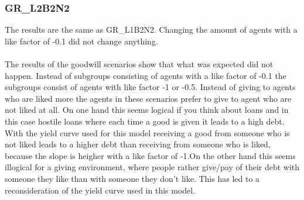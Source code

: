 \documentclass[twoside,openright]{uva-bachelor-thesis}
\begin{document}
\subsubsection{GR\_L2B2N2}
The results are the same as GR\_L1B2N2. Changing the amount of agents with a like factor of -0.1 did not change anything.
\\
\\
The results of the goodwill scenarios show that what was expected did not happen. Instead of subgroups consisting of agents with a like factor of -0.1 the subgroups consist of agents with like factor -1 or -0.5. Instead of giving to agents who are liked more the agents in these scenarios prefer to give to agent who are not liked at all. On one hand this seems logical if you think about loans and in this case hostile loans where each time a good is given it leads to a high debt. With the yield curve used for this model receiving a good from someone who is not liked leads to a higher debt than receiving from someone who is liked, because the slope is heigher with a like factor of -1.On the other hand this seems illogical for a giving environment, where people rather give/pay of their debt with someone they like than with someone they don't like. This has led to a reconsideration of the yield curve used in this model.
\end{document}
